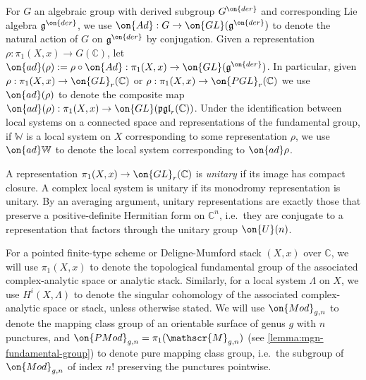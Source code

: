 \begin{notation}
\notready
	\label{notation:adjoint}
	For $G$ an algebraic group with derived subgroup $G^{\on{der}}$ and
corresponding Lie algebra $\mathfrak g^{\on{der}}$, we use
$\on{Ad} : G \to \on{GL}(\mathfrak g^{\on{der}})$
to denote the natural action of $G$ on $\mathfrak{g}^{\on{der}}$ by conjugation.
Given a representation $\rho: \pi_1(X, x) \to G(\mathbb C)$, let $\on{ad}(\rho)
:= \rho \circ \on{Ad}: \pi_1(X, x) \to \on{GL}(\mathfrak g^{\on{der}})$.
In particular, given
$\rho : \pi_1(X, x) \to \on{GL}_r(\mathbb C)$ or
$\rho : \pi_1(X, x) \to \on{PGL}_r(\mathbb C)$
we use $\on{ad}(\rho)$ to denote the composite map
$\on{ad}(\rho) : \pi_1(X, x) \to \on{GL}(\mathfrak {pgl}_r(\mathbb C))$.
Under the identification between local systems on a connected space and representations of the
fundamental group, if $\mathbb W$ is a local system on $X$ corresponding to some representation $\rho$,
we use $\on{ad}\mathbb W$ to denote the local system corresponding to
$\on{ad}\rho$.

A representation $\pi_1(X,x)\to \on{GL}_r(\mathbb{C})$ is \emph{unitary} if its image has
compact closure.
A complex local system is unitary if its monodromy representation is unitary. By
an averaging argument, unitary representations are exactly those that preserve a positive-definite Hermitian form on $\mathbb{C}^n$, i.e.~they are conjugate to a representation that factors through the unitary group $\on{U}(n)$.
\end{notation}

\begin{notation}
\notready
For a pointed finite-type scheme or Deligne-Mumford stack $(X, x)$ over
$\mathbb{C}$, we will use $\pi_1(X, x)$ to denote the topological fundamental group
 of the associated complex-analytic space or analytic stack.
Similarly, for a local system $\Lambda$ on $X$, we use
$H^i(X, \Lambda)$ to denote the singular cohomology of the associated complex-analytic space or stack, unless otherwise stated. We will use $\on{Mod}_{g,n}$ to denote the mapping class group of an orientable surface of genus $g$ with $n$ punctures, and $\on{PMod}_{g,n}=\pi_1(\mathscr{M}_{g,n})$
(see \autoref{lemma:mgn-fundamental-group})
to denote pure mapping class group, i.e.~the subgroup of $\on{Mod}_{g,n}$ of index $n!$ preserving the punctures pointwise.
\end{notation}

